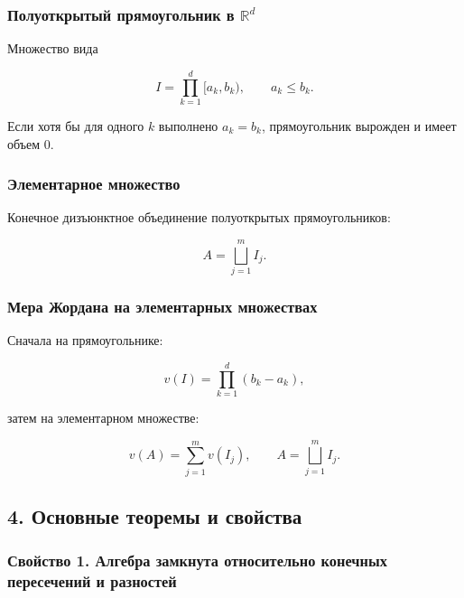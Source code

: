 \documentclass[
  11pt,
  a4paper,
]{article}
\begin{document}
\subsubsection{\texorpdfstring{Полуоткрытый прямоугольник в
\(\mathbb R^d\)}{Полуоткрытый прямоугольник в \textbackslash mathbb R\^{}d}}\label{ux43fux43eux43bux443ux43eux442ux43aux440ux44bux442ux44bux439-ux43fux440ux44fux43cux43eux443ux433ux43eux43bux44cux43dux438ux43a-ux432-mathbb-rd}

Множество вида

\[
I=\prod_{k=1}^d[a_k,b_k),\qquad a_k\le b_k.
\]

Если хотя бы для одного \(k\) выполнено \(a_k=b_k\), прямоугольник
вырожден и имеет объем \(0\).

\subsubsection{Элементарное
множество}\label{ux44dux43bux435ux43cux435ux43dux442ux430ux440ux43dux43eux435-ux43cux43dux43eux436ux435ux441ux442ux432ux43e}

Конечное дизъюнктное объединение полуоткрытых прямоугольников:

\[
A=\bigsqcup_{j=1}^m I_j.
\]

\subsubsection{Мера Жордана на элементарных
множествах}\label{ux43cux435ux440ux430-ux436ux43eux440ux434ux430ux43dux430-ux43dux430-ux44dux43bux435ux43cux435ux43dux442ux430ux440ux43dux44bux445-ux43cux43dux43eux436ux435ux441ux442ux432ux430ux445}

Сначала на прямоугольнике:

\[
v(I)=\prod_{k=1}^d(b_k-a_k),
\]

затем на элементарном множестве:

\[
v(A)=\sum_{j=1}^m v(I_j),\qquad A=\bigsqcup_{j=1}^m I_j.
\]

\subsection{4. Основные теоремы и
свойства}\label{ux43eux441ux43dux43eux432ux43dux44bux435-ux442ux435ux43eux440ux435ux43cux44b-ux438-ux441ux432ux43eux439ux441ux442ux432ux430}

\subsubsection{Свойство 1. Алгебра замкнута относительно конечных
пересечений и
разностей}\label{ux441ux432ux43eux439ux441ux442ux432ux43e-1.-ux430ux43bux433ux435ux431ux440ux430-ux437ux430ux43cux43aux43dux443ux442ux430-ux43eux442ux43dux43eux441ux438ux442ux435ux43bux44cux43dux43e-ux43aux43eux43dux435ux447ux43dux44bux445-ux43fux435ux440ux435ux441ux435ux447ux435ux43dux438ux439-ux438-ux440ux430ux437ux43dux43eux441ux442ux435ux439}
\end{document}
